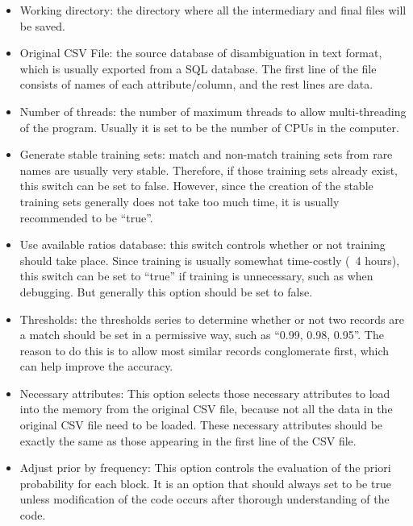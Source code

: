 \documentclass{article}
\begin{document}
\begin{itemize}

\item Working directory: the directory where all the intermediary 
and final files will be saved.

\item Original CSV File: the source database of disambiguation in 
text format, which is usually exported from a SQL database. 
The first line of the file consists of names of each
attribute/column, and the rest lines are data.

\item Number of threads: the number of maximum threads to 
allow multi-threading of the program. Usually it is set to 
be the number of CPUs in the computer.

\item  Generate stable training sets: match and non-match 
training sets from rare names are usually very stable. Therefore, 
if those training sets already exist, this switch can be set 
to false. However, since the creation of the stable 
training sets generally does not take too much time,
it is usually recommended to be “true”.


\item Use available ratios database: this switch controls 
whether or not training should take place. Since training is 
usually somewhat time-costly (~4 hours), this switch can be 
set to “true” if training is unnecessary, such as 
when debugging. But generally this option should be set to false.

\item Thresholds: the thresholds series to determine whether 
or not two records are a match should be set in a permissive way, 
such as “0.99, 0.98, 0.95”. The reason to do this is to allow most
similar records conglomerate first, which can help improve the accuracy.

\item Necessary attributes: This option selects those necessary 
attributes to load into the memory from the original CSV file, 
because not all the data in the original CSV file need to be loaded.
These necessary attributes should be exactly the same as those 
appearing in the first line of the CSV file.

\item Adjust prior by frequency: This option controls the evaluation 
of the priori probability for each block. It is an option that 
should always set to be true unless modification of the code
occurs after thorough understanding of the code.


\end{itemize}
\end{document}
